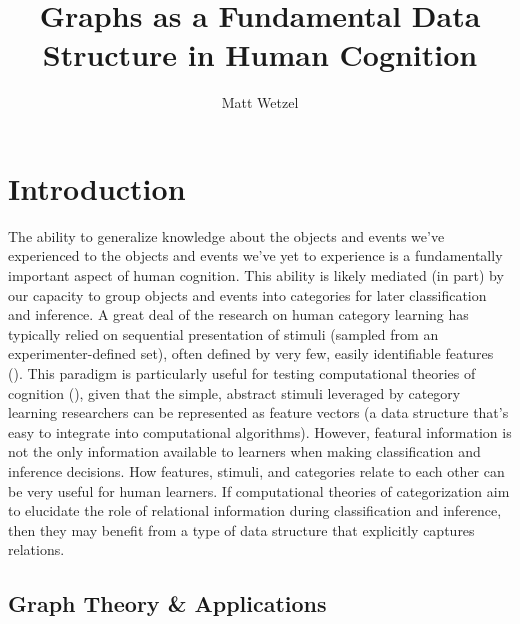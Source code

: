\documentclass[12pt]{article}
\title{Graphs as a Fundamental Data Structure in Human Cognition}
\author{Matt Wetzel}
\let\oldcite=\cite
\renewcommand{\cite}[1]{\textcolor[rgb]{0, .121, .388}{\oldcite{#1}}}
\begin{document}
%
%
\maketitle
\pagebreak

\tableofcontents
\pagebreak











%
%

\section{Introduction}

The ability to generalize knowledge about the objects and events we've experienced to the objects and events we've yet to experience is a fundamentally important aspect of human cognition. This ability is likely mediated (in part) by our capacity to group objects and events into categories for later classification and inference. A great deal of the research on human category learning has typically relied on sequential presentation of stimuli (sampled from an experimenter-defined set), often defined by very few, easily identifiable features (\cite{kurtz2015human}). This paradigm is particularly useful for testing computational theories of cognition (\cite{wills2012adequacy}), given that the simple, abstract stimuli leveraged by category learning researchers can be represented as feature vectors (a data structure that's easy to integrate into computational algorithms). However, featural information is not the only information available to learners when making classification and inference decisions. How features, stimuli, and categories relate to each other can be very useful for human learners. If computational theories of categorization aim to elucidate the role of relational information during classification and inference, then they may benefit from a type of data structure that explicitly captures relations.

\subsection{Graph Theory \& Applications}
\end{document}

